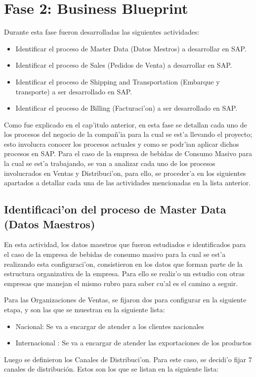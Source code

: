 \section{Fase 2: Business Blueprint}
	Durante esta fase fueron desarrolladas las siguientes actividades:
\begin{itemize}
\item Identificar el proceso de Master Data (Datos Mestros) a desarrollar en SAP.
\item Identificar el proceso de Sales (Pedidos de Venta) a desarrollar en SAP.
\item Identificar el proceso de Shipping and Transportation (Embarque y transporte) a ser desarrollado en SAP.
\item Identificar el proceso de Billing (Facturaci'on) a ser desarrollado en SAP.
\end{itemize}

	Como fue explicado en el cap'itulo anterior, en esta fase se detallan cada uno de los procesos del negocio de la compa\~n'ia para la cual se est'a llevando el proyecto; esto involucra conocer los procesos actuales y como se podr'ian aplicar dichos procesos en SAP. 
\newline
\newline
\indent Para el caso de la empresa de bebidas de Consumo Masivo para la cual se est'a trabajando, se van a analizar cada uno de los procesos involucrados en Ventas y Distribuci'on, para ello, se proceder'a en los siguientes apartados a detallar cada una de las actividades mencionadas en la lista anterior.
	
\subsection{Identificaci'on del proceso de Master Data (Datos Maestros)}
	En esta actividad, los datos maestros que fueron estudiados e identificados para el caso de la empresa de bebidas de consumo masivo para la cual se est'a realizando esta configuraci'on, consistieron en los datos que forman parte de la estructura organizativa de la empresa. Para ello se realiz'o un estudio con otras empresas que manejan el mismo rubro para saber cu'al es el camino a seguir. 

	Para las Organizaciones de Ventas, se fijaron dos para configurar en la siguiente etapa, y son las que se muestran en la siguiente lista:

\begin{itemize}

\item Nacional: Se va a encargar de atender a los clientes nacionales
\item Internacional : Se va a encargar de atender las exportaciones de los productos
\end{itemize}
	Luego se definieron los Canales de Distribuci'on. Para este caso, se decidi'o fijar 7 canales de distribución. Estos son los que se listan en la siguiente lista:

